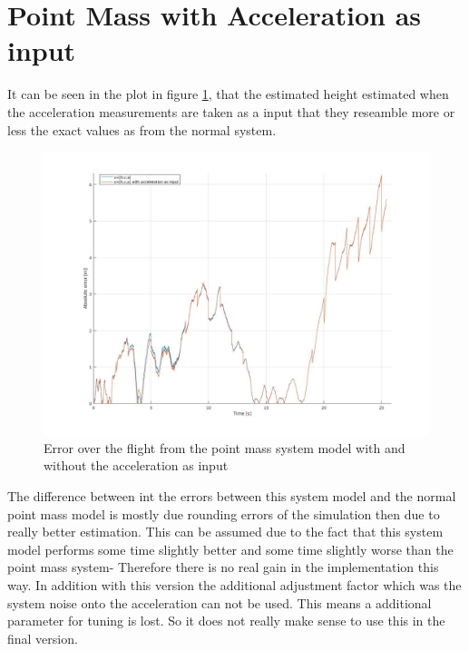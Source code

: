 \section{Point Mass with Acceleration as input}
It can be seen in the plot in figure \ref{fig:PointMassVSAccelerationInput}, that the estimated height estimated when the acceleration measurements are taken as a input that they reseamble more or less the exact values as from the normal system.
\begin{figure}[h!]
 \centering
 \includegraphics[width=.8\textwidth]{./Pictures/PointMassVSAccelerationInput.jpg}
 \caption{Error over the flight from the point mass system model with and without the acceleration as input}
 \label{fig:PointMassVSAccelerationInput}
\end{figure}

The difference between int the errors between this system model and the normal point mass model is mostly due rounding errors of the simulation then due to really better estimation.
This can be assumed due to the fact that this system model performs some time slightly better and some time slightly worse than the point mass system-
Therefore there is no real gain in the implementation this way.
In addition with this version the additional adjustment factor which was the system noise onto the acceleration can not be used.
This means a additional parameter for tuning is lost.
So it does not really make sense to use this in the final version.


